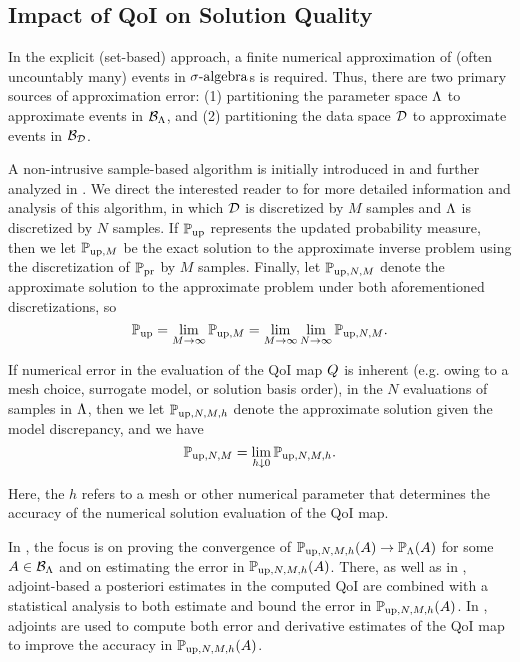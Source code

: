 \subsection{Impact of QoI on Solution Quality }\label{sec:impact}

In the explicit (set-based) approach, a finite numerical approximation of (often uncountably many) events in $\sigma\text{-algebra}$s is required.
Thus, there are two primary sources of approximation error: (1) partitioning the parameter space ${\Lambda}$ to approximate events in $\mathcal{B}_{{\Lambda}}$, and (2) partitioning the data space $\mathcal{D}$ to approximate events in $\mathcal{B}_{\mathcal{D}}$.

A non-intrusive sample-based algorithm is initially introduced in \cite{BET+14} and further analyzed in \cite{BET+14-arxiv}.
We direct the interested reader to \cite{BET+14-arxiv} for more detailed information and analysis of this algorithm, in which $\mathcal{D}$ is discretized by $M$ samples and ${\Lambda}$ is discretized by $N$ samples.
If $\operatorname*{\mathbb{P}_{up}}$ represents the updated probability measure, then we let $\mathbb{P}_{\text{up},M}$ be the exact solution to the approximate inverse problem using the discretization of $\operatorname*{\mathbb{P}_{pr}}$ by $M$ samples.
Finally, let $\mathbb{P}_{\text{up},N,M}$ denote the approximate solution to the approximate problem under both aforementioned discretizations, so
\[
\operatorname*{\mathbb{P}_{up}} = \lim\limits_{M\to\infty} \mathbb{P}_{\text{up},M} = \lim\limits_{M\to\infty} \lim\limits_{N\to\infty} \mathbb{P}_{\text{up},N,M}.
\]

If numerical error in the evaluation of the QoI map $Q$ is inherent (e.g. owing to a mesh choice, surrogate model, or solution basis order), in the $N$ evaluations of samples in ${\Lambda}$, then we let $\mathbb{P}_{\text{up},N,M,h}$ denote the approximate solution given the model discrepancy, and we have
\[
\mathbb{P}_{\text{up},N,M}= \lim\limits_{h \downarrow 0} \mathbb{P}_{\text{up},N,M,h}.
\]

Here, the $h$ refers to a mesh or other numerical parameter that determines the accuracy of the numerical solution evaluation of the QoI map.


In \cite{BM17}, the focus is on proving the convergence of $\mathbb{P}_{\text{up},N,M,h}(A) \to \mathbb{P}_{{\Lambda}} (A)$ for some $A\in \mathcal{B}_{{\Lambda}}$ and on estimating the error in $\mathbb{P}_{\text{up},N,M,h}(A)$.
There, as well as in \cite{JWW17}, adjoint-based a posteriori estimates in the computed QoI are combined with a statistical analysis to both estimate and bound the error in $\mathbb{P}_{\text{up},N,M,h} (A)$.
In \cite{BM17}, adjoints are used to compute both error and derivative estimates of the QoI map to improve the accuracy in $\mathbb{P}_{\text{up},N,M,h} (A)$.

